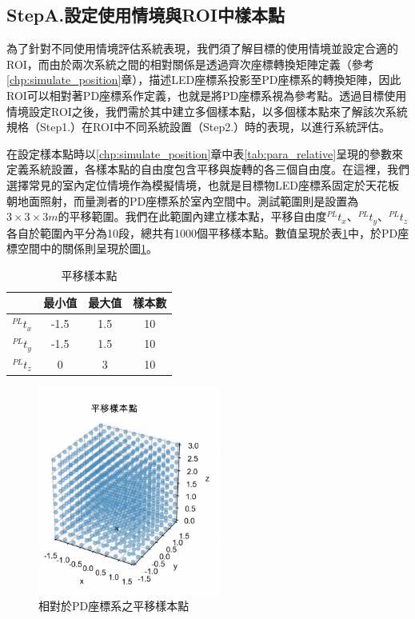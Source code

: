 \subsection{StepA.設定使用情境與ROI中樣本點}
\label{chp:scenario}




為了針對不同使用情境評估系統表現，我們須了解目標的使用情境並設定合適的ROI，而由於兩次系統之間的相對關係是透過齊次座標轉換矩陣定義（參考\ref{chp:simulate_position}章），描述LED座標系投影至PD座標系的轉換矩陣，因此ROI可以相對著PD座標系作定義，也就是將PD座標系視為參考點。透過目標使用情境設定ROI之後，我們需於其中建立多個樣本點，以多個樣本點來了解該次系統規格（Step1.）在ROI中不同系統設置（Step2.）時的表現，以進行系統評估。

在設定樣本點時以\ref{chp:simulate_position}章中表\ref{tab:para_relative}呈現的參數來定義系統設置，各樣本點的自由度包含平移與旋轉的各三個自由度。在這裡，我們選擇常見的室內定位情境作為模擬情境，也就是目標物LED座標系固定於天花板朝地面照射，而量測者的PD座標系於室內空間中。測試範圍則是設置為$3 \times 3 \times 3 m$的平移範圍。我們在此範圍內建立樣本點，平移自由度$^{PL}t_x$、$^{PL}t_y$、$^{PL}t_z$各自於範圍內平分為10段，總共有1000個平移樣本點。數值呈現於表\ref{tab:translate}中，於PD座標空間中的關係則呈現於圖\ref{pic:translate_sample}。

\begin{table}[htpb]
    \begin{center}
      \caption{平移樣本點}
      \label{tab:translate}
      \begin{tabular}{c|c|c|c} %
         & \textbf{最小值} & \textbf{最大值}&\textbf{樣本數}\\
        \hline
        $^{PL}t_x$ & -1.5 & 1.5&10\\
        $^{PL}t_y$ & -1.5 & 1.5&10\\
        $^{PL}t_z$ & 0 & 3 &10\\
      \end{tabular}
    \end{center}
  \end{table}

\begin{figure}[htpb]
    \centering
    \includegraphics[width=6cm]{ch4pic/translate_sample.png}
    \caption{相對於PD座標系之平移樣本點}
    \label{pic:translate_sample}
\end{figure}

